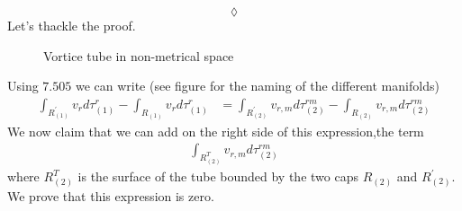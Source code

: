 $$\lozenge$$
Let's thackle the proof.
\begin{figure}[H]%
    \centering
    \subfloat[]{}
\caption{Vortice tube in non-metrical space}
\label{fig:fig_p280a}
\end{figure}
Using $\mathbf{7.505}$ we can write (see figure for the naming of the different manifolds) 
\begin{align}
\int_{R^{'}_{(1)}}v_r d\tau_{(1)}^r - \int_{R^{}_{(1)}}v_r d\tau_{(1)}^r &= \int_{R^{'}_{(2)}}v_{r,m}d\tau_{(2)}^{rm} - \int_{R^{}_{(2)}}v_{r,m}d\tau_{(2)}^{rm}
\end{align}
We now claim that we can add on the right side of this expression,the term 
\begin{align}
 \int_{R^{T}_{(2)}}v_{r,m}d\tau_{(2)}^{rm} 
\end{align}
where $R^{T}_{(2)}$ is the surface of the tube bounded by the two caps $R^{}_{(2)}$ and $R^{'}_{(2)}$. We prove that this expression is zero.\\\\

